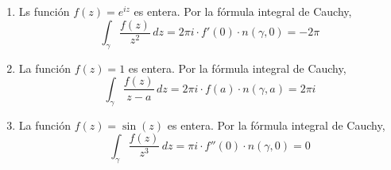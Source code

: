 \begin{solution}
\begin{enumerate}[label=(\alph*)]
    \item Ls función $f(z) = e^{iz}$ es entera. Por la fórmula integral de Cauchy,
    $$\int_\gamma \frac {f(z)} {z^2} \, dz = 2\pi i \cdot f'(0) \cdot n(\gamma, 0) = -2\pi$$
    
    \item La función $f(z) = 1$ es entera. Por la fórmula integral de Cauchy,
    $$\int_\gamma \frac {f(z)} {z-a} \, dz = 2\pi i \cdot f(a) \cdot n(\gamma, a) = 2\pi i$$
    
    \item La función $f(z) = \sin(z)$ es entera. Por la fórmula integral de Cauchy,
    $$\int_\gamma \frac {f(z)} {z^3} \, dz = \pi i \cdot f''(0) \cdot n(\gamma, 0) = 0$$
\end{enumerate}
\end{solution}
